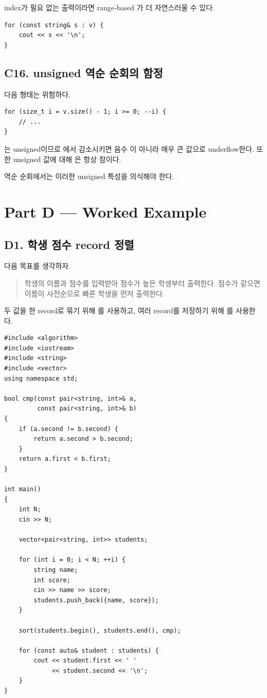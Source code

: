 index가 필요 없는 출력이라면 range-based 가 더 자연스러울 수 있다.
\begin{lstlisting}
for (const string& s : v) {
    cout << s << '\n';
}
\end{lstlisting}

\subsection{C16. unsigned 역순 순회의 함정}
다음 형태는 위험하다.
\begin{lstlisting}
for (size_t i = v.size() - 1; i >= 0; --i) {
    // ...
}
\end{lstlisting}

는 unsigned이므로 에서 감소시키면 음수 이 아니라 매우 큰 값으로 underflow한다. 또한 unsigned 값에 대해 은 항상 참이다.

역순 순회에서는 이러한 unsigned 특성을 의식해야 한다.

\section{Part D --- Worked Example}

\subsection{D1. 학생 점수 record 정렬}
다음 목표를 생각하자.
\begin{quote}
학생의 이름과 점수를 입력받아 점수가 높은 학생부터 출력한다. 점수가 같으면 이름이 사전순으로 빠른 학생을 먼저 출력한다.
\end{quote}

두 값을 한 record로 묶기 위해 를 사용하고, 여러 record를 저장하기 위해 를 사용한다.

\begin{lstlisting}
#include <algorithm>
#include <iostream>
#include <string>
#include <vector>
using namespace std;

bool cmp(const pair<string, int>& a,
         const pair<string, int>& b)
{
    if (a.second != b.second) {
        return a.second > b.second;
    }
    return a.first < b.first;
}

int main()
{
    int N;
    cin >> N;

    vector<pair<string, int>> students;

    for (int i = 0; i < N; ++i) {
        string name;
        int score;
        cin >> name >> score;
        students.push_back({name, score});
    }

    sort(students.begin(), students.end(), cmp);

    for (const auto& student : students) {
        cout << student.first << ' '
             << student.second << '\n';
    }
}
\end{lstlisting}

